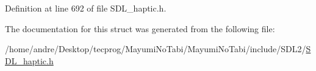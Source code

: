 Definition at line 692 of file S\-D\-L\-\_\-haptic.\-h.



The documentation for this struct was generated from the following file\-:\begin{DoxyCompactItemize}
\item 
/home/andre/\-Desktop/tecprog/\-Mayumi\-No\-Tabi/\-Mayumi\-No\-Tabi/include/\-S\-D\-L2/\hyperlink{_s_d_l__haptic_8h}{S\-D\-L\-\_\-haptic.\-h}\end{DoxyCompactItemize}
